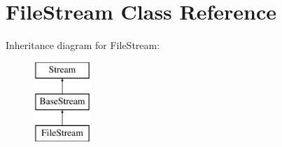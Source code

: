 \hypertarget{class_file_stream}{}\section{File\+Stream Class Reference}
\label{class_file_stream}
Inheritance diagram for File\+Stream\+:\begin{figure}[H]
\begin{center}
\leavevmode
\includegraphics[height=3.000000cm]{class_file_stream}
\end{center}
\end{figure}
